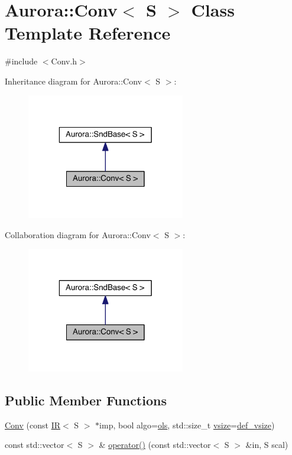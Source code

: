 \hypertarget{class_aurora_1_1_conv}{}\section{Aurora\+:\+:Conv$<$ S $>$ Class Template Reference}
\label{class_aurora_1_1_conv}


{\ttfamily \#include $<$Conv.\+h$>$}



Inheritance diagram for Aurora\+:\+:Conv$<$ S $>$\+:
\nopagebreak
\begin{figure}[H]
\begin{center}
\leavevmode
\includegraphics[width=196pt]{class_aurora_1_1_conv__inherit__graph}
\end{center}
\end{figure}


Collaboration diagram for Aurora\+:\+:Conv$<$ S $>$\+:
\nopagebreak
\begin{figure}[H]
\begin{center}
\leavevmode
\includegraphics[width=196pt]{class_aurora_1_1_conv__coll__graph}
\end{center}
\end{figure}
\subsection*{Public Member Functions}
\begin{DoxyCompactItemize}
\item 
\hyperlink{class_aurora_1_1_conv_a55fda098ad783bd6283fed023d3129b1}{Conv} (const \hyperlink{class_aurora_1_1_i_r}{IR}$<$ S $>$ $\ast$imp, bool algo=\hyperlink{namespace_aurora_a4e816792565225ccd6ba67110f75fb8b}{ols}, std\+::size\+\_\+t \hyperlink{class_aurora_1_1_snd_base_af9e21aaf411b17f7a8221c991ce5d291}{vsize}=\hyperlink{namespace_aurora_afaaddf667a06e7ce23c667a8b7295263}{def\+\_\+vsize})
\item 
const std\+::vector$<$ S $>$ \& \hyperlink{class_aurora_1_1_conv_aeefccb7a11338388723bb78e025ad030}{operator()} (const std\+::vector$<$ S $>$ \&in, S scal)
\end{DoxyCompactItemize}


